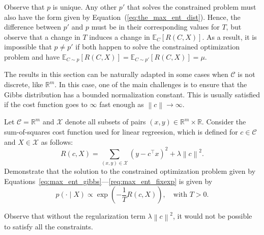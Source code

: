 Observe that $p$ is unique. Any other $p'$ that solves the constrained problem must also have the form given by Equation~(\ref{eq:the_max_ent_dist}). Hence, the difference between $p'$ and $p$ must be in their corresponding values for $T$, but observe that a change in $T$ induces a change in $\mathbb{E}_{C}[R(C, X)]$. As a result, it is impossible that $p \neq p'$ if both happen to solve the constrained optimization problem and have $\mathbb{E}_{C\sim p}[R(C, X)] = \mathbb{E}_{C\sim p'}[R(C, X)] = \mu$.
%

The results in this section can be naturally adapted in some cases when $\mathcal{C}$ is not discrete, like $\mathbb{R}^m$. In this case, one of the main challenges is to ensure that the Gibbs distribution has a bounded normalization constant. This is usually satisfied if the cost function goes to $\infty$ fast enough as $\left\|c\right\| \to \infty$.

\begin{exercise}
Let $\mathcal{C} = \mathbb{R}^m$ and $\mathcal{X}$ denote all subsets of pairs $(x, y) \in \mathbb{R}^m \times \mathbb{R}$. Consider the sum-of-squares cost function used for linear regreesion, which is defined for $c \in \mathcal{C}$ and $X \in \mathcal{X}$ as follows:
%
\begin{equation}
R(c, X) = \sum_{(x, y) \in \mathcal{X}} \left(y - c^\top x\right)^2 + \lambda \left\|c\right\|^2.
\end{equation}
%
Demonstrate that the solution to the constrained optimization problem given by Equations~\ref{eq:max_ent_gibbs}---\ref{req:max_ent_fixexp} is given by
%
$$p(\cdot \mid X) \propto \exp\left(-\frac{1}{T}R(c, X)\right), \quad \text{with $T > 0$}.$$
%
\end{exercise}

Observe that without the regularization term $\lambda \left\|c\right\|^2$, it would not be possible to satisfy all the constraints.

